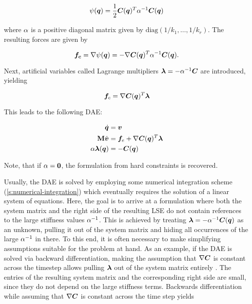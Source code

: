\begin{equation}\label{eq:compliant-potential}
    \psi(\bm{q}) = \frac{1}{2}\bm{C}(\bm{q})^T \mathbf{\alpha}^{-1}\bm{C}(\bm{q})
\end{equation}

\noindent where $\mathbf{\alpha}$ is a positive diagonal matrix given by $\text{diag}(1/k_1, \ldots, 1/k_r)$. The resulting forces are given by 

\begin{equation}\label{eq:compliant-force}
    \bm{f_c} = \nabla \psi(\bm{q}) = -\nabla \bm{C}(\bm{q})^T\mathbf{\alpha}^{-1} \bm{C}(\bm{q}).
\end{equation}

\noindent Next, artificial variables called Lagrange multipliers $\bm{\lambda} = -\mathbf{\alpha}^{-1}\bm{C}$ are introduced, yielding 

\begin{equation}\label{eq:compliant-force-lambda}
    \bm{f}_c = \nabla \bm{C}(\bm{q})^T\bm{\lambda}
\end{equation}

\noindent This leads to the following DAE:

\begin{equation}\label{eq:compliant-dae}
\begin{split}
    \dot{\bm{q}} &= \bm{v} \\
    \mathbf{M}\dot{\bm{v}} &= \bm{f}_{e} + \nabla \bm{C}(\bm{q})^T\bm{\lambda} \\
    \mathbf{\alpha}\bm{\lambda}(\bm{q}) &= -\bm{C}(\bm{q})
\end{split}
\end{equation}

\noindent Note, that if $\mathbf{\alpha} = \mathbf{0}$, the formulation from hard constraints is recovered. 

Usually, the DAE is solved by employing some numerical integration scheme (\cref{s:numerical-integration}) which eventually requires 
the solution of a linear system of equations. Here, the goal is to arrive at a formulation where both the system matrix and the right 
side of the resulting LSE do not contain references to the large stiffness values
$\mathbf{\alpha}^{-1}$. This is achieved by treating $\bm{\lambda} = -\mathbf{\alpha}^{-1}\bm{C}(\bm{q})$ as an unknown, 
pulling it out of the system matrix and hiding all occurrences of the large $\mathbf{\alpha}^{-1}$ in there. To this end, it is often 
necessary to make simplifying assumptions suitable for the problem at hand. As an example, if the DAE is solved via backward 
differentiation, making the assumption that $\nabla \bm{C}$ is constant across the timestep allows pulling $\bm{\lambda}$ out of 
the system matrix entirely \cite{tournier2015}. The entries of the resulting system matrix and the corresponding right side
are small, since they do not depend on the large stiffness terms. Backwards differentiation while assuming that $\nabla \bm{C}$ is 
constant across the time step yields

